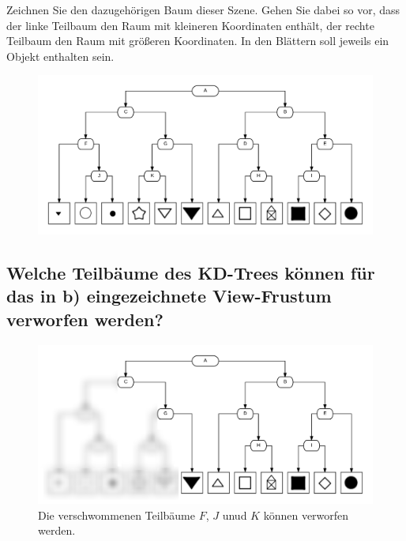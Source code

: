 \documentclass[a4paper,10pt,DIV=14]{article}
\begin{document}
Zeichnen Sie den dazugehörigen Baum dieser Szene. Gehen Sie dabei so vor, dass der linke Teilbaum den Raum mit kleineren Koordinaten enthält, der rechte Teilbaum den Raum mit größeren Koordinaten. In den Blättern soll jeweils ein Objekt enthalten sein.

\begin{figure}[!htbp]
	\centering
	\includegraphics[width=1\linewidth]{kd}
\end{figure}

\newpage
\subsection{Welche Teilbäume des KD-Trees können für das in b) eingezeichnete View-Frustum verworfen werden?}

\begin{figure}[!htbp]
	\centering
	\includegraphics[width=1\linewidth]{kd_blur}
	\caption*{Die verschwommenen Teilbäume $F$, $J$ unud $K$ können verworfen werden.}
\end{figure}
\end{document}
